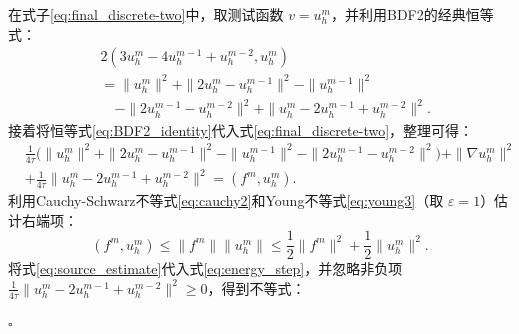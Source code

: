 \documentclass{GZUbachelorthesis}
\makeatletter
\renewcommand{\proofname}{证明}
\renewenvironment{proof}[1][\proofname]{\par
	\normalfont
	\topsep6\p@\@plus6\p@\relax
	\trivlist
	\setlength{\itemindent}{2em}%
	\item[\hskip\labelsep{\songti #1：}]\ignorespaces
}{\hfill\ensuremath{\square}\endtrivlist\@endpefalse}
\theoremstyle{chineseplain}
\makeatother
\begin{document}
\begin{proof}
	在式子\eqref{eq:final_discrete-two}中，取测试函数 $v = u_h^m$，并利用BDF2的经典恒等式：
\begin{equation}
	\label{eq:BDF2_identity}
	\begin{aligned}
		& 2(3u_h^m - 4u_h^{m-1} + u_h^{m-2}, u_h^m) \\
		&= \| u_h^m \|^2 + \| 2u_h^m - u_h^{m-1} \|^2 - \| u_h^{m-1} \|^2 \\
		&\quad - \| 2u_h^{m-1} - u_h^{m-2} \|^2 + \| u_h^m - 2u_h^{m-1} + u_h^{m-2} \|^2.
	\end{aligned}
\end{equation}
	接着将恒等式\eqref{eq:BDF2_identity}代入式\eqref{eq:final_discrete-two}，整理可得：
	\begin{equation}\label{eq:energy_step}
		\begin{aligned}
			&\frac{1}{4\tau} \big( \| u_h^m \|^2 + \| 2u_h^m - u_h^{m-1} \|^2 - \| u_h^{m-1} \|^2 - \| 2u_h^{m-1} - u_h^{m-2} \|^2 \big) + \| \nabla u_h^m \|^2 \\
			&+ \frac{1}{4\tau} \| u_h^m - 2u_h^{m-1} + u_h^{m-2} \|^2 = (f^m, u_h^m).
		\end{aligned}
	\end{equation}
	利用Cauchy-Schwarz不等式\eqref{eq:cauchy2}和Young不等式\eqref{eq:young3}（取 $\varepsilon = 1$）估计右端项：
	\begin{equation}\label{eq:source_estimate}
		(f^m, u_h^m) \leq \| f^m \|\| u_h^m \| \leq  \frac{1}{2} \| f^m \|^2 + \frac{1}{2} \| u_h^m \|^2.
	\end{equation}
	将式\eqref{eq:source_estimate}代入式\eqref{eq:energy_step}，并忽略非负项 $\frac{1}{4\tau} \| u_h^m - 2u_h^{m-1} + u_h^{m-2} \|^2 \geq 0$，得到不等式：

\end{proof}
\end{document}
